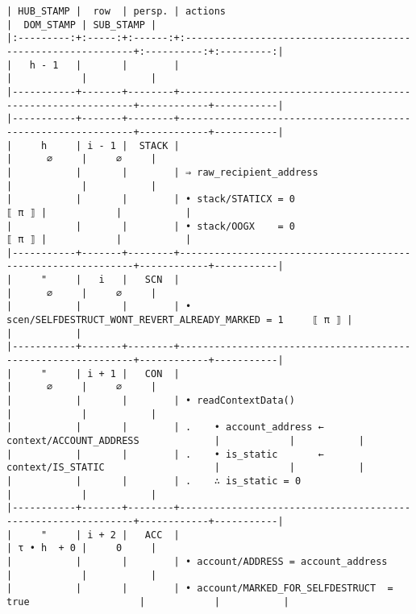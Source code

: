 \documentclass[varwidth=\maxdimen,margin=0.5cm,multi={verbatim}]{standalone}
\begin{document}
\begin{verbatim}
| HUB_STAMP |  row  | persp. | actions                                                      |  DOM_STAMP | SUB_STAMP |
|:---------:+:-----:+:------:+:-------------------------------------------------------------+:----------:+:---------:|
|   h - 1   |       |        |                                                              |            |           |
|-----------+-------+--------+--------------------------------------------------------------+------------+-----------|
|-----------+-------+--------+--------------------------------------------------------------+------------+-----------|
|     h     | i - 1 |  STACK |                                                              |      ∅     |     ∅     |
|           |       |        | ⇒ raw_recipient_address                                      |            |           |
|           |       |        | • stack/STATICX = 0                                    ⟦ π ⟧ |            |           |
|           |       |        | • stack/OOGX    = 0                                    ⟦ π ⟧ |            |           |
|-----------+-------+--------+--------------------------------------------------------------+------------+-----------|
|     "     |   i   |   SCN  |                                                              |      ∅     |     ∅     |
|           |       |        | • scen/SELFDESTRUCT_WONT_REVERT_ALREADY_MARKED = 1     ⟦ π ⟧ |            |           |
|-----------+-------+--------+--------------------------------------------------------------+------------+-----------|
|     "     | i + 1 |   CON  |                                                              |      ∅     |     ∅     |
|           |       |        | • readContextData()                                          |            |           |
|           |       |        | .    • account_address ← context/ACCOUNT_ADDRESS             |            |           |
|           |       |        | .    • is_static       ← context/IS_STATIC                   |            |           |
|           |       |        | .    ∴ is_static = 0                                         |            |           |
|-----------+-------+--------+--------------------------------------------------------------+------------+-----------|
|     "     | i + 2 |   ACC  |                                                              | τ • h  + 0 |     0     |
|           |       |        | • account/ADDRESS = account_address                          |            |           |
|           |       |        | • account/MARKED_FOR_SELFDESTRUCT  =  true                   |            |           |

\end{verbatim}
\end{document}
